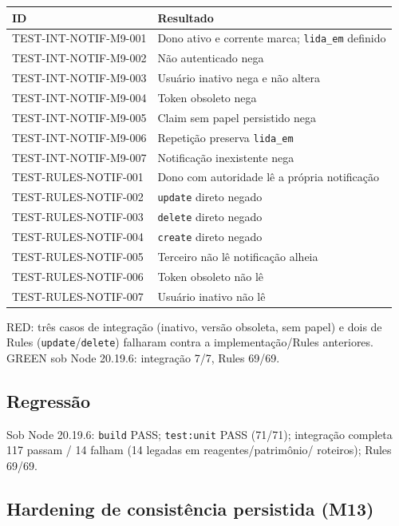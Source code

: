 \small
\begin{longtable}{@{}p{}p{}@{}}
\toprule
ID & Resultado \\
\midrule
\endhead
TEST-INT-NOTIF-M9-001 & Dono ativo e corrente marca; \texttt{lida\_em} definido \\
TEST-INT-NOTIF-M9-002 & Não autenticado nega \\
TEST-INT-NOTIF-M9-003 & Usuário inativo nega e não altera \\
TEST-INT-NOTIF-M9-004 & Token obsoleto nega \\
TEST-INT-NOTIF-M9-005 & Claim sem papel persistido nega \\
TEST-INT-NOTIF-M9-006 & Repetição preserva \texttt{lida\_em} \\
TEST-INT-NOTIF-M9-007 & Notificação inexistente nega \\
TEST-RULES-NOTIF-001 & Dono com autoridade lê a própria notificação \\
TEST-RULES-NOTIF-002 & \texttt{update} direto negado \\
TEST-RULES-NOTIF-003 & \texttt{delete} direto negado \\
TEST-RULES-NOTIF-004 & \texttt{create} direto negado \\
TEST-RULES-NOTIF-005 & Terceiro não lê notificação alheia \\
TEST-RULES-NOTIF-006 & Token obsoleto não lê \\
TEST-RULES-NOTIF-007 & Usuário inativo não lê \\
\bottomrule
\end{longtable}
\normalsize

RED: três casos de integração (inativo, versão obsoleta, sem papel) e dois de
Rules (\texttt{update}/\texttt{delete}) falharam contra a implementação/Rules
anteriores. GREEN sob Node 20.19.6: integração 7/7, Rules 69/69.

\subsection{Regressão}

Sob Node 20.19.6: \texttt{build} PASS; \texttt{test:unit} PASS (71/71);
integração completa 117 passam / 14 falham (14 legadas em reagentes/patrimônio/
roteiros); Rules 69/69.

\subsection{Hardening de consistência persistida (M13)}

